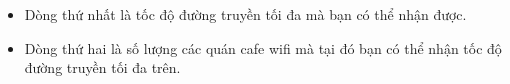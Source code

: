 \begin{itemize}
	\item Dòng thứ nhất là tốc độ đường truyền tối đa mà bạn có thể nhận được.
	\item Dòng thứ hai là số lượng các quán cafe wifi mà tại đó bạn có thể nhận tốc độ đường truyền tối đa trên.
\end{itemize}